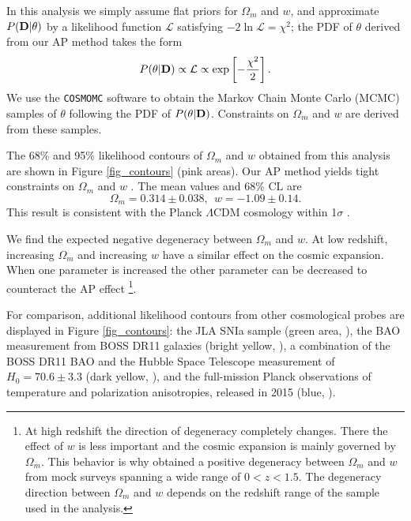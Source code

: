 \documentclass[iop]{emulateapj}
\begin{document}
In this analysis we simply assume flat priors for $\Omega_m$ and $w$,
and approximate $P({\bf D}|{\bf \theta})$ by a likelihood function $\mathcal{L}$
satisfying  $-2 \ln \mathcal{L}=\chi^2$;
the PDF of $\theta$ derived from our AP method takes the form
\begin{equation}
 P({\bf \theta}|{\bf D}) \propto \mathcal{L} \propto \exp\left[-\frac{\chi^2}{2}\right].
\end{equation}
We use the {\texttt {COSMOMC}} software \citep{LB2002}
to obtain the Markov Chain Monte Carlo (MCMC) samples of $\theta$ following the PDF of $P({\bf \theta}|{\bf D})$.
Constraints on $\Omega_m$ and $w$ are derived from these samples.

The 68\% and 95\% likelihood contours of $\Omega_m$ and $w$ 
obtained from this analysis are shown in Figure \ref{fig_contours} (pink areas).
Our AP method yields tight constraints on $\Omega_m$ and $w$ .
The mean values and 68\% CL are
\begin{equation}
 \Omega_m=0.314 \pm 0.038,\ \ w = -1.09 \pm 0.14.
\end{equation}
This result is consistent with the Planck $\Lambda$CDM cosmology within 1$\sigma$ \citep{Planck2015}.

We find the expected negative degeneracy between $\Omega_m$ and $w$.
At low redshift, increasing $\Omega_m$ and increasing $w$ have a similar effect on the cosmic expansion.
When one parameter is increased the other parameter can be decreased to counteract the AP effect
\footnote{At high redshift the direction of degeneracy completely changes. 
There the effect of $w$ is less important and the cosmic expansion is mainly governed by $\Omega_m$.
This behavior is why \cite{Li2015} obtained a positive degeneracy between $\Omega_m$ and $w$ from mock surveys 
spanning a wide range of $0< z < 1.5$.
The degeneracy direction between $\Omega_m$ and $w$ depends on the redshift range of the sample used in the analysis.
}.

For comparison, additional likelihood contours from other cosmological probes are displayed in Figure \ref{fig_contours}:
the JLA SNIa sample (green area, \cite{JLA}),
the BAO measurement from BOSS DR11 galaxies (bright yellow, \cite{Anderson2013}),
a combination of the BOSS DR11 BAO and the Hubble Space Telescope measurement of $H_0=70.6\pm3.3$ (dark yellow, \cite{Riess2011,E14H0}),
and the full-mission Planck observations of temperature and polarization anisotropies, released in 2015 (blue, \cite{Planck2015}).
\end{document}
